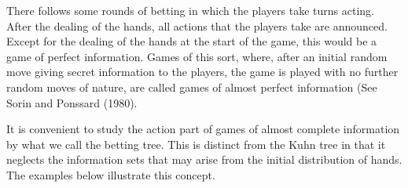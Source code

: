 \documentclass[]{report}
\begin{document}
There follows some rounds of betting in which the players take turns acting. After
the dealing of the hands, all actions that the players take are announced. Except for the
dealing of the hands at the start of the game, this would be a game of perfect information.
Games of this sort, where, after an initial random move giving secret information to the
players, the game is played with no further random moves of nature, are called games of
almost perfect information (See Sorin and Ponssard (1980).

It is convenient to study the action part of games of almost complete information by
what we call the betting tree. This is distinct from the Kuhn tree in that it neglects the
information sets that may arise from the initial distribution of hands. The examples below
illustrate this concept.
\end{document}
